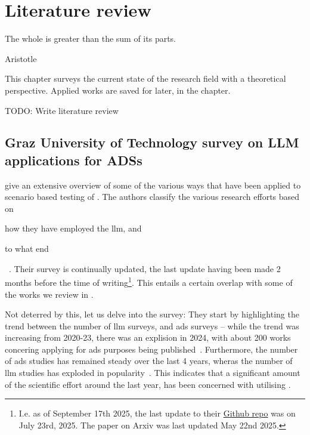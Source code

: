 \chapter{Literature review}\label{chp:literatureReview}

\epigraph{The whole is greater than the sum of its parts.}{Aristotle}

This chapter surveys the current state of the research field with a theoretical
perspective. Applied works are saved for later, in the  chapter.

TODO: Write literature review

\section{Graz University of Technology survey on LLM applications for ADSs} %

\citeauthor{surveyLLMScenarioBasedTesting} give an extensive overview of some of the various ways
that  have been applied to scenario based testing of .
The authors classify the various research efforts based on \begin{inparaenum}
    \item how they have employed the \acrshort{llm}, and
    \item to what end
\end{inparaenum}~\cite{surveyLLMScenarioBasedTesting}.
Their survey is continually updated, the last update having been made 2 months before the time of
writing\footnote{I.e. as of September 17th 2025, the last update to their
    \href{https://github.com/ftgTUGraz/LLM4ADSTest}{Github repo} was on July 23rd, 2025. The paper on
    Arxiv was last updated May 22nd 2025.}. This entails a certain overlap with some of the works we
review in .

Not deterred by this, let us delve into the survey:
They start by highlighting the trend between the number of \acrshort{llm} surveys, and
\acrshort{ads} surveys -- while the trend was increasing from 2020-23, there was an explision in
\num{2024}, with about \num{200} works concering applying  for \acrlong{ads}
purposes being published~\cite[p. 1, figure (b)]{surveyLLMScenarioBasedTesting}. Furthermore, the
number of \acrshort{ads} studies has remained steady over the last \num{4}  years, wheras the number
of \acrshort{llm} studies has exploded in popularity~\cite[p. 1, figure
    (a)]{surveyLLMScenarioBasedTesting}. This indicates that a significant amount of the scientific
effort around  the last year, has been concerned with utilising .


